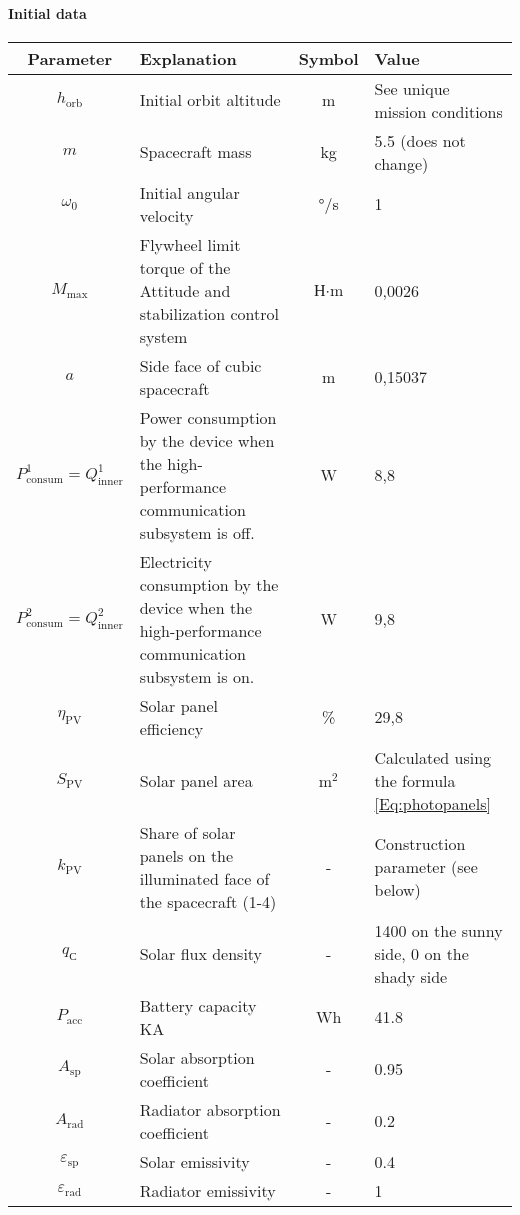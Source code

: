 \documentclass[12pt,a4paper]{article}
\begin{document}
\paragraph{Initial data}

\begin{center}
\begin{longtable}{ |c|p{5cm}|c|p{5cm}| }
  \hline
  \textbf{Parameter} & \textbf{Explanation} & \textbf{Symbol} & \textbf{Value} \\
  \hline
  \endhead
  $h_{\text{orb}}$ & Initial orbit altitude & m & See unique mission conditions \\
  \hline
  $m$ & Spacecraft mass & kg & 5.5 (does not change)\\
  \hline
  $\omega_0$ & Initial angular velocity & °/s & 1\\
  \hline
  $M_{\text{max}}$ & Flywheel limit torque of the Attitude and stabilization control system & $\text{Н} \cdot \text{m}$ &
  0,0026\\
  \hline
  $a$ & Side face of cubic spacecraft & m& 0,15037\\
  \hline
  $P^1_{\text{consum}} = Q^1_{\text{inner}}$ & Power consumption by the device when the high-performance communication subsystem is off. & W & 8,8\\
  \hline
  $P^2_{\text{consum}} = Q^2_{\text{inner}}$ & Electricity consumption by the device when the high-performance communication subsystem is on. & W & 9,8\\
  \hline
  $\eta_{\text{PV}}$ & Solar panel efficiency & \% & 29,8\\
  \hline
  $S_{\text{PV}}$ & Solar panel area & $\text{m}^2$ & Calculated using the formula
  \ref{Eq:photopanels}\\
  \hline
  $k_{\text{PV}}$ & Share of solar panels on the illuminated face of the spacecraft (1-4) & - &
   Construction parameter (see below)\\
  \hline
  $q_{\text{С}}$ & Solar flux density & - & 1400 on the sunny side, 0 on the shady side\\
  \hline
  $P_{\text{acc}}$ & Battery capacity KA & Wh & 41.8\\
  \hline
  $A_{\text{sp}}$ & Solar absorption coefficient & - & 0.95\\
  \hline
  $A_{\text{rad}}$ & Radiator absorption coefficient & - & 0.2\\
  \hline
  $\varepsilon_{\text{sp}}$ & Solar emissivity & - & 0.4\\
  \hline
  $\varepsilon_{\text{rad}}$ & Radiator emissivity & - & 1\\

\end{longtable}
\end{center}
\end{document}
